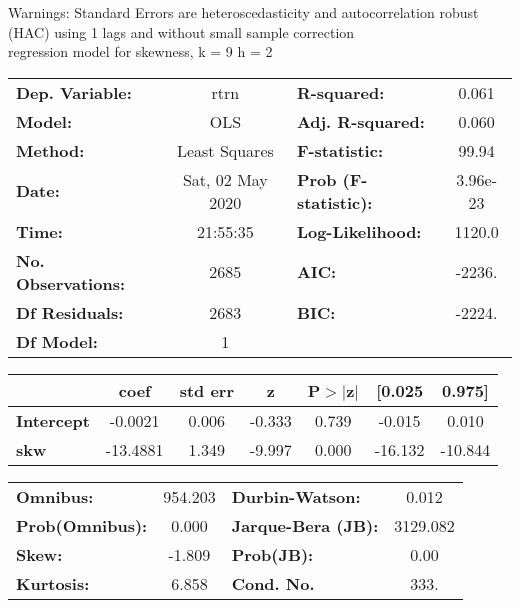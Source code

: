 Warnings: \newline
 [1] Standard Errors are heteroscedasticity and autocorrelation robust (HAC) using 1 lags and without small sample correction\\ 

regression model for skewness, k = 9 h = 2\begin{center}
\begin{tabular}{lclc}
\toprule
\textbf{Dep. Variable:}    &       rtrn       & \textbf{  R-squared:         } &     0.061   \\
\textbf{Model:}            &       OLS        & \textbf{  Adj. R-squared:    } &     0.060   \\
\textbf{Method:}           &  Least Squares   & \textbf{  F-statistic:       } &     99.94   \\
\textbf{Date:}             & Sat, 02 May 2020 & \textbf{  Prob (F-statistic):} &  3.96e-23   \\
\textbf{Time:}             &     21:55:35     & \textbf{  Log-Likelihood:    } &    1120.0   \\
\textbf{No. Observations:} &        2685      & \textbf{  AIC:               } &    -2236.   \\
\textbf{Df Residuals:}     &        2683      & \textbf{  BIC:               } &    -2224.   \\
\textbf{Df Model:}         &           1      & \textbf{                     } &             \\
\bottomrule
\end{tabular}
\begin{tabular}{lcccccc}
                   & \textbf{coef} & \textbf{std err} & \textbf{z} & \textbf{P$> |$z$|$} & \textbf{[0.025} & \textbf{0.975]}  \\
\midrule
\textbf{Intercept} &      -0.0021  &        0.006     &    -0.333  &         0.739        &       -0.015    &        0.010     \\
\textbf{skw}       &     -13.4881  &        1.349     &    -9.997  &         0.000        &      -16.132    &      -10.844     \\
\bottomrule
\end{tabular}
\begin{tabular}{lclc}
\textbf{Omnibus:}       & 954.203 & \textbf{  Durbin-Watson:     } &    0.012  \\
\textbf{Prob(Omnibus):} &   0.000 & \textbf{  Jarque-Bera (JB):  } & 3129.082  \\
\textbf{Skew:}          &  -1.809 & \textbf{  Prob(JB):          } &     0.00  \\
\textbf{Kurtosis:}      &   6.858 & \textbf{  Cond. No.          } &     333.  \\
\bottomrule
\end{tabular}
\end{center}

